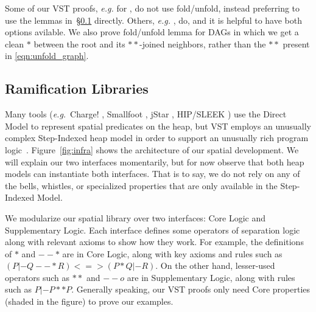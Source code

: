 Some of our VST proofs, \emph{e.g.} for , do not use fold/unfold, instead preferring to use the lemmas in~\S\ref{sec:ramifylib} directly.  Others, \emph{e.g.} , do, and it is helpful to have both options avilable. We also prove fold/unfold lemma for DAGs in which we get a clean $*$ between the root and its $**$-joined neighbors, rather than the $**$ present in \eqref{eqn:unfold_graph}.


\subsection{Ramification Libraries}\label{sec:ramifylib}




Many tools (\emph{e.g.}\ Charge! \citep{bengtson:charge},
Smallfoot \citep{berdine:smallfoot}, jStar \citep{distefanop08},
HIP/SLEEK \citep{chin:hipsleek}) use the Direct Model to represent
spatial predicates on the heap, but VST employs an unusually complex
Step-Indexed heap model in order to support an unusually rich program
logic~\cite{appel:programlogics}.  Figure~\ref{fig:infra} shows the
architecture of our spatial development.  We will explain our two
interfaces momentarily, but for now observe that both heap models can
instantiate both interfaces. That is to say, we do not rely on any of the
bells, whistles, or specialized properties that are only available 
in the Step-Indexed Model.

We modularize our spatial library over 
two interfaces: Core Logic and Supplementary Logic.
Each interface defines some operators of separation logic 
along with relevant axioms to show how they work.  
For example, the definitions of $*$ and
$--*$ are in Core Logic, along with key axioms and rules such as
$(P |- Q --* R) <=> (P * Q |- R)$.  
On the other hand, lesser-used operators such as 
$**$ and $--o$ are in Supplementary Logic,
along with rules such as $P |- P ** P$. 
Generally speaking, our VST proofs only need Core properties 
(shaded in the figure) to prove our examples.


